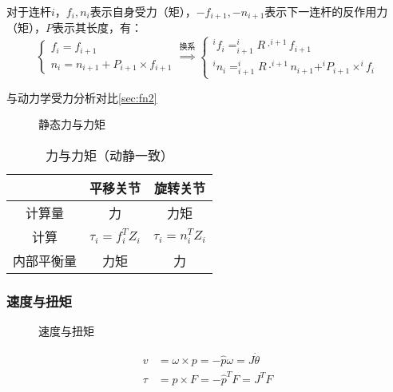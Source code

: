 \documentclass[
12pt, %
a4paper, 
oneside, %
headinclude,footinclude, %
]{scrartcl}
\begin{document}
对于连杆$ i $，$ f_i, n_i $表示自身受力（矩），$ -f_{i + 1}, -n_{i + 1} $表示下一连杆的反作用力（矩），$ P $表示其长度，有：
$$
\begin{cases}
f_i = f_{i + 1} \\
n_i = n_{i + 1} + P_{i + 1} \times f_{i + 1}
\end{cases}
\overset{\text{换系}}{\Longrightarrow}
\begin{cases}
^i f_i = ^i_{i + 1}R \cdot ^{i + 1} f_{i + 1} \\
^i n_i = ^i_{i + 1}R \cdot ^{i + 1} n_{i + 1} + ^i P_{i + 1} \times ^i f_i
\end{cases}
$$

与动力学受力分析对比\ref{sec:fn2}

\begin{figure}[H]
\centering
{} \quad
{} \quad
{}
\caption[静态力与力矩]{静态力与力矩}
\end{figure}

\begin{table}[H]
\centering
\begin{tabular}{c|cc}
\hline
& 平移关节 & 旋转关节 \\
\hline
计算量 & 力 & 力矩 \\
计算 & $ \tau_i = f_i^T Z_i $ & $ \tau_i = n_i^T Z_i $ \\
内部平衡量 & 力矩 & 力 \\
\hline
\end{tabular}
\caption{力与力矩（动静一致）}
\end{table}
\subsubsection{速度与扭矩}
\begin{figure}[H]
\centering
\subfloat[角速度与线速度]{\texttt{[image: wv]}} \quad
\subfloat[力与扭矩]{\texttt{[image: ft]}}
\caption[速度与扭矩]{速度与扭矩}
\end{figure}

\begin{align*}
v &= \omega \times p = -\hat{p} \omega = J \dot{\theta} \\
\tau &= p \times F = -\hat{p}^T F = J^T F
\end{align*}
\end{document}
